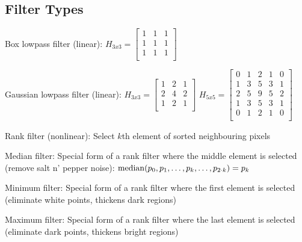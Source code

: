 \subsection{Filter Types}
  \label{sec:filter_types}
\begin{liste}
  \item Box lowpass filter (linear): $H_{3x3}= \begin{bmatrix}
   1 & 1 & 1\\
   1 & 1 & 1\\
   1 & 1 & 1\\
  \end{bmatrix}$
  
  \item Gaussian lowpass filter (linear): 
  $H_{3x3}= \begin{bmatrix}
   1 & 2 & 1\\
   2 & 4 & 2\\
   1 & 2 & 1 \\
  \end{bmatrix}$
  $H_{5x5} = \begin{bmatrix}
   0 & 1 & 2 & 1 & 0\\
   1 & 3 & 5 & 3 & 1\\
   2 & 5 & 9 & 5 & 2\\
   1 & 3 & 5 & 3 & 1\\
   0 & 1 & 2 & 1 & 0\\
  \end{bmatrix}$
  
  \item Rank filter (nonlinear): Select $k$th element of sorted neighbouring pixels
    \begin{liste}
      \item Median filter: Special form of a rank filter where the middle element is selected 
      (remove salt n' pepper noise): $\operatorname{median}(p_0, p_1, \ldots,p_k,\ldots,p_{2\cdot k}) = p_k$
      
      \item Minimum filter: Special form of a rank filter where the first element is selected 
      (eliminate white points, thickens dark regions)
      
      \item Maximum filter: Special form of a rank filter where the last element is selected 
      (eliminate dark points, thickens bright regions)
    \end{liste}
  

\end{liste}
